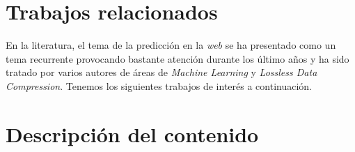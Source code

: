 \section{Trabajos relacionados}

En la literatura, el tema de la predicción en la \emph{web} se ha presentado como un tema recurrente provocando bastante atención durante los último años y ha sido tratado por varios autores de áreas de \emph{Machine Learning} y \emph{Lossless Data Compression}. Tenemos los siguientes trabajos de interés a continuación.


	










\section{Descripción del contenido} 



